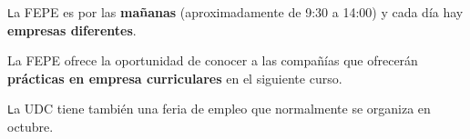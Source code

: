 \begin{infoBox}
    \texttt La \acrshort{FEPE} es por las \textbf{mañanas} (aproximadamente de 9:30 a 14:00) y cada día hay \textbf{empresas diferentes}.
\end{infoBox}

\begin{warningBox}
    La FEPE ofrece la oportunidad de conocer a las compañías que ofrecerán \textbf{prácticas en empresa curriculares} en el siguiente curso.
\end{warningBox}

\begin{curiosityBox}
    \texttt La \acrshort{UDC} tiene también una feria de empleo que normalmente se organiza en octubre.
\end{curiosityBox}
